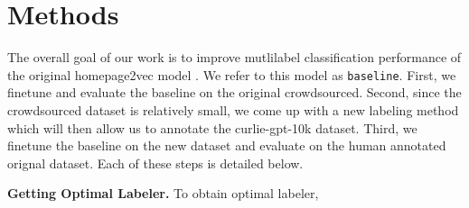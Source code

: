 \section{Methods}\label{sec:methods}
The overall goal of our work is to improve mutlilabel classification performance of the original homepage2vec model \cite{homepage2vec}. We refer to this model as \texttt{baseline}. First, we finetune and evaluate the baseline on the original crowdsourced. Second, since the crowdsourced dataset is relatively small, we come up with a new labeling method which will then allow us to annotate the curlie-gpt-10k dataset. Third, we finetune the baseline on the new dataset and evaluate on the human annotated orignal dataset.  Each of these steps is detailed below.


\textbf{Getting Optimal Labeler.} To obtain optimal labeler, 




